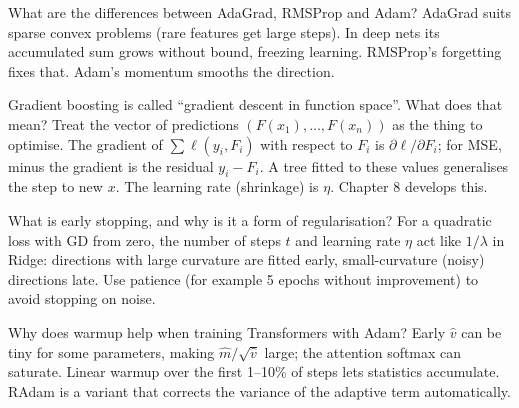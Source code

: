 \begin{qa}{What are the differences between AdaGrad, RMSProp and Adam?}
\why AdaGrad suits sparse convex problems (rare features get large steps). In deep nets its accumulated sum grows without
bound, freezing learning. RMSProp's forgetting fixes that. Adam's momentum smooths the direction.
\end{qa}

\begin{qa}{\deep Gradient boosting is called ``gradient descent in function space''. What does that mean?}
\why Treat the vector of predictions $(F(x_1),\dots,F(x_n))$ as the thing to optimise. The gradient of $\sum\ell(y_i,F_i)$ with
respect to $F_i$ is $\partial\ell/\partial F_i$; for MSE, minus the gradient is the residual $y_i - F_i$. A tree fitted to these
values generalises the step to new $x$. The learning rate (shrinkage) is $\eta$. Chapter 8 develops this.
\end{qa}

\begin{qa}{What is early stopping, and why is it a form of regularisation?}
\why For a quadratic loss with GD from zero, the number of steps $t$ and learning rate $\eta$ act like $1/\lambda$ in Ridge:
directions with large curvature are fitted early, small-curvature (noisy) directions late. Use patience (for example 5 epochs
without improvement) to avoid stopping on noise.
\end{qa}

\begin{qa}{\deep Why does warmup help when training Transformers with Adam?}
\why Early $\hat v$ can be tiny for some parameters, making $\hat m/\sqrt{\hat v}$ large; the attention softmax can saturate.
Linear warmup over the first 1--10\% of steps lets statistics accumulate. RAdam is a variant that corrects the variance of
the adaptive term automatically.
\end{qa}


